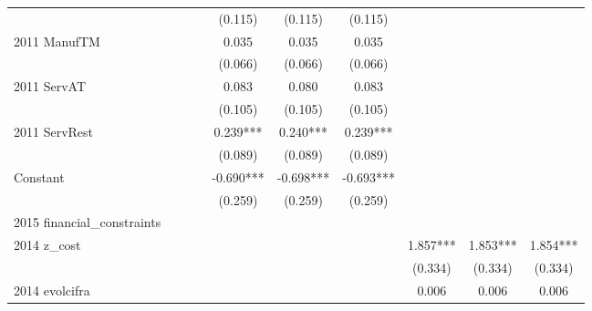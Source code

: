 \begin{table}[htbp]
\begin{tabular}{l*{9}{c}}
                    &               &               &               &     (0.115)   &     (0.115)   &     (0.115)   &               &               &               \\
2011 ManufTM        &               &               &               &       0.035   &       0.035   &       0.035   &               &               &               \\
                    &               &               &               &     (0.066)   &     (0.066)   &     (0.066)   &               &               &               \\
2011 ServAT         &               &               &               &       0.083   &       0.080   &       0.083   &               &               &               \\
                    &               &               &               &     (0.105)   &     (0.105)   &     (0.105)   &               &               &               \\
2011 ServRest       &               &               &               &       0.239***&       0.240***&       0.239***&               &               &               \\
                    &               &               &               &     (0.089)   &     (0.089)   &     (0.089)   &               &               &               \\
Constant            &               &               &               &      -0.690***&      -0.698***&      -0.693***&               &               &               \\
                    &               &               &               &     (0.259)   &     (0.259)   &     (0.259)   &               &               &               \\
\hline
2015 financial\_constraints&               &               &               &               &               &               &               &               &               \\
2014 z\_cost         &               &               &               &               &               &               &       1.857***&       1.853***&       1.854***\\
                    &               &               &               &               &               &               &     (0.334)   &     (0.334)   &     (0.334)   \\
2014 evolcifra      &               &               &               &               &               &               &       0.006   &       0.006   &       0.006   \\

\end{tabular}
\end{table}
